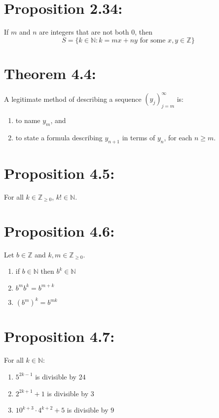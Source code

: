 \section*{Proposition 2.34:}
If $m$ and $n$ are integers that are not both $0$, then
\[ S = \{ k \in \mathbb{N} : k = mx + ny \text{ for some } x,y \in \mathbb{Z} \} \]


\section*{Theorem 4.4:}
A legitimate method of describing a sequence $(y_j)_{j=m}^{\infty}$ is:
\begin{enumerate}
    \item to name $y_m$, and
    \item to state a formula describing $y_{n+1}$ in terms of $y_n$, for each $n \geq m$.
\end{enumerate}

\section*{Proposition 4.5:}
For all $k \in \mathbb{Z}_{\geq 0}$, $k! \in \mathbb{N}$.

\section*{Proposition 4.6:}
Let $b \in \mathbb{Z}$ and $k,m \in \mathbb{Z}_{\geq 0}$.
\begin{enumerate}
    \item if $b \in \mathbb{N}$ then $b^k \in \mathbb{N}$
    \item $b^mb^k = b^{m+k}$
    \item $(b^m)^k = b^{mk}$
\end{enumerate}

\section*{Proposition 4.7:}
For all $k \in \mathbb{N}$:
\begin{enumerate}
    \item $5^{2k-1}$ is divisible by $24$
    \item $2^{2k+1} + 1$ is divisible by $3$
    \item $10^{k+3} \cdot 4^{k+2} + 5$ is divisible by $9$
\end{enumerate}

